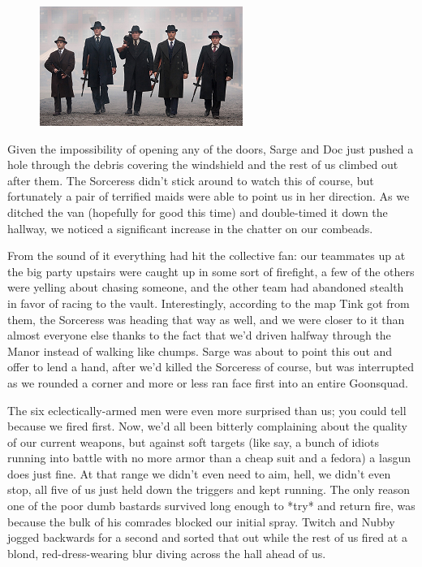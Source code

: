 \begin{figure}
	\begin{center}
		\includegraphics[width=\figwidth]{pics/18/59.png}
	\end{center}
\end{figure}
Given the impossibility of opening any of the doors, Sarge and Doc just pushed a hole through the debris covering the windshield and the rest of us climbed out after them. 
The Sorceress didn't stick around to watch this of course, but fortunately a pair of terrified maids were able to point us in her direction. 
As we ditched the van (hopefully for good this time) and double-timed it down the hallway, we noticed a significant increase in the chatter on our combeads. 


From the sound of it everything had hit the collective fan: 
our teammates up at the big party upstairs were caught up in some sort of firefight, a few of the others were yelling about chasing someone, and the other team had abandoned stealth in favor of racing to the vault. 
Interestingly, according to the map Tink got from them, the Sorceress was heading that way as well, and we were closer to it than almost everyone else thanks to the fact that we'd driven halfway through the Manor instead of walking like chumps. 
Sarge was about to point this out and offer to lend a hand, after we'd killed the Sorceress of course, but was interrupted as we rounded a corner and more or less ran face first into an entire Goonsquad.

The six eclectically-armed men were even more surprised than us; 
you could tell because we fired first. 
Now, we'd all been bitterly complaining about the quality of our current weapons, but against soft targets (like say, a bunch of idiots running into battle with no more armor than a cheap suit and a fedora) a lasgun does just fine. 
At that range we didn't even need to aim, hell, we didn't even stop, all five of us just held down the triggers and kept running. 
The only reason one of the poor dumb bastards survived long enough to *try* and return fire, was because the bulk of his comrades blocked our initial spray. 
 Twitch and Nubby jogged backwards for a second and sorted that out while the rest of us fired at a blond, red-dress-wearing blur diving across the hall ahead of us.

